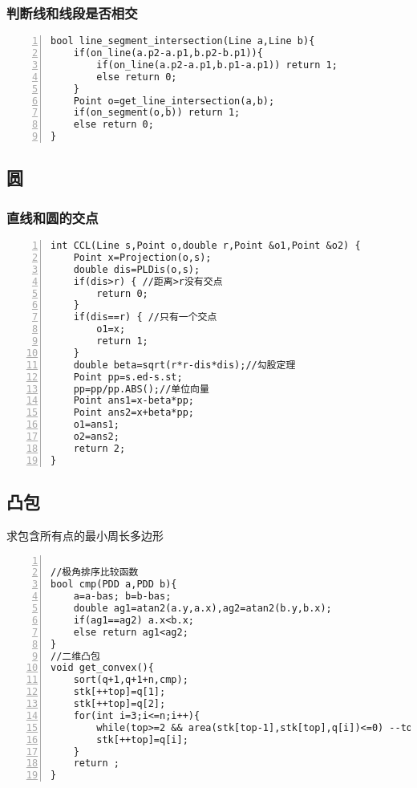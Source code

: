 \subsubsection{判断线和线段是否相交}

\begin{lstlisting}[language={[ANSI]C},numbers=left]
bool line_segment_intersection(Line a,Line b){
	if(on_line(a.p2-a.p1,b.p2-b.p1)){
		if(on_line(a.p2-a.p1,b.p1-a.p1)) return 1;
		else return 0;
	} 
	Point o=get_line_intersection(a,b);
	if(on_segment(o,b)) return 1;
	else return 0;
}
\end{lstlisting}

\subsection{圆}

\subsubsection{直线和圆的交点}

\begin{lstlisting}[language={[ANSI]C},numbers=left]
int CCL(Line s,Point o,double r,Point &o1,Point &o2) {
    Point x=Projection(o,s);
    double dis=PLDis(o,s);
    if(dis>r) { //距离>r没有交点 
        return 0;
    }
    if(dis==r) { //只有一个交点
        o1=x;
        return 1;
    }
    double beta=sqrt(r*r-dis*dis);//勾股定理
    Point pp=s.ed-s.st;
    pp=pp/pp.ABS();//单位向量
    Point ans1=x-beta*pp;
    Point ans2=x+beta*pp;
    o1=ans1;
    o2=ans2;
    return 2;
}
\end{lstlisting}



\subsection{凸包}

求包含所有点的最小周长多边形

\begin{lstlisting}[language={[ANSI]C},numbers=left]

//极角排序比较函数
bool cmp(PDD a,PDD b){
    a=a-bas; b=b-bas;
	double ag1=atan2(a.y,a.x),ag2=atan2(b.y,b.x);
    if(ag1==ag2) a.x<b.x;
	else return ag1<ag2;
}
//二维凸包
void get_convex(){
	sort(q+1,q+1+n,cmp);
	stk[++top]=q[1];
	stk[++top]=q[2];
	for(int i=3;i<=n;i++){
		while(top>=2 && area(stk[top-1],stk[top],q[i])<=0) --top;
		stk[++top]=q[i];
	}
	return ;
}
\end{lstlisting}

